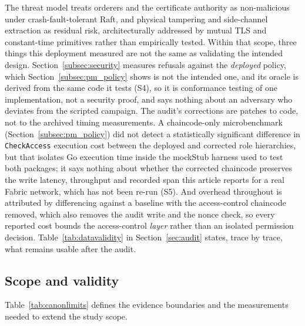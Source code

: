 \documentclass[a4paper,fleqn]{cas-sc}
\begin{document}
The threat model treats orderers and the certificate authority as
non-malicious under crash-fault-tolerant Raft, and physical tampering and
side-channel extraction as residual risk, architecturally addressed by
mutual TLS and constant-time primitives rather than empirically tested.
Within that scope, three things this deployment measured are not the same
as validating the intended design. Section~\ref{subsec:security} measures
refusals against the \emph{deployed} policy, which
Section~\ref{subsec:pm_policy} shows is not the intended one, and its
oracle is derived from the same code it tests (S4), so it is conformance
testing of one implementation, not a security proof, and says nothing
about an adversary who deviates from the scripted campaign. The
audit's corrections are patches to code, not to the archived timing
measurements. A chaincode-only microbenchmark (Section~\ref{subsec:pm_policy})
did not detect a statistically significant difference in \texttt{CheckAccess} execution cost between the deployed and corrected role hierarchies, but that isolates Go
execution time inside the mockStub harness used to test both packages; it
says nothing about whether the corrected chaincode preserves the write
latency, throughput and recorded span this article reports for a real
Fabric network, which has not been re-run (S5). And overhead throughout is
attributed by differencing against a
baseline with the access-control chaincode removed, which also removes the
audit write and the nonce check, so every reported cost bounds the
access-control \emph{layer} rather than an isolated permission decision.
Table~\ref{tab:datavalidity} in Section~\ref{sec:audit} states, trace
by trace, what remains usable after the audit.

\subsection{Scope and validity}
\label{subsec:limits}
\label{subsec:threats}

Table~\ref{tab:canonlimits} defines the evidence boundaries and the
measurements needed to extend the study scope.
\end{document}
